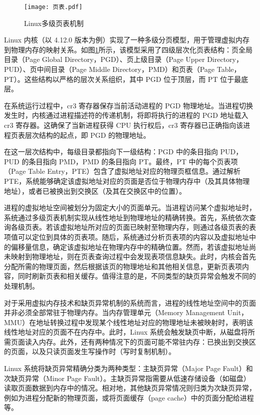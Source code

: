 \begin{figure}[htb]
    \centering
    \texttt{[image: 页表.pdf]}
    \caption{Linux多级页表机制}
    \label{页表}
\end{figure}

Linux 内核（以 4.12.0 版本为例）实现了一种多级分页模型，用于管理虚拟内存到物理内存的映射关系。如图\ref{页表}所示，该模型采用了四级层次化页表结构：页全局目录（Page Global Directory，PGD）、页上级目录（Page Upper Directory，PUD）、页中间目录（Page Middle Directory，PMD）和页表（Page Table，PT）。这些结构以严格的层次关系组织，其中 PGD 位于顶层，而 PT 位于最底层。

在系统运行过程中，cr3 寄存器保存当前活动进程的 PGD 物理地址。当进程切换发生时，内核通过进程描述符的传递机制，将即将执行的进程的 PGD 地址载入 cr3 寄存器。这确保了当新进程获得 CPU 执行权后，cr3 寄存器已正确指向该进程页表层次结构的起点，即 PGD 的物理地址。

在这一层次结构中，每级目录都指向下一级结构：PGD 中的条目指向 PUD，PUD 的条目指向 PMD，PMD 的条目指向 PT。最终，PT 中的每个页表项（Page Table Entry，PTE）包含了虚拟地址对应的物理页框信息。通过解析 PTE，系统能够确定该虚拟地址对应的页面是否位于物理内存中（及其具体物理地址），或者已被换出到交换区（及其在交换区中的位置）。

进程的虚拟地址空间被划分为固定大小的页面单元。当进程访问某个虚拟地址时，系统通过多级页表机制实现从线性地址到物理地址的精确转换。首先，系统依次查询各级页表。若该虚拟地址所对应的页面已映射至物理内存，则通过各级页表的表项值可以定位到具体的页表项。随后，系统通过分析页表项的内容以及虚拟地址中的偏移量信息，确定该虚拟地址在物理内存中的精确位置。然而，若该虚拟地址尚未映射到物理地址，则在页表查询过程中会发现表项信息缺失。此时，内核会首先分配所需的物理页面，然后根据该页的物理地址和其他相关信息，更新页表项内容，同时刷新页表和相关缓存。值得注意的是，不同类型的缺页异常会触发不同的处理机制。

对于采用虚拟内存技术和缺页异常机制的系统而言，进程的线性地址空间中的页面并非必须全部常驻于物理内存。当内存管理单元（Memory Management Unit，MMU）在地址转换过程中发现某个线性地址对应的物理地址未被映射时，表明该线性地址对应的页面不在内存中。此时，Linux 系统会触发缺页中断，从磁盘将所需页面读入内存。此外，还有两种情况下的页面可能不常驻内存：已换出到交换区的页面，以及只读页面发生写操作时（写时复制机制）。

Linux 系统将缺页异常精确分类为两种类型：主缺页异常（Major Page Fault）和次缺页异常（Minor Page Fault）。主缺页异常指需要从低速存储设备（如磁盘）读取页面数据到内存中的情况。相对地，其他缺页异常情况则归类为次缺页异常，例如为进程分配新的物理页面，或将页面缓存（page cache）中的页面分配给进程等。

